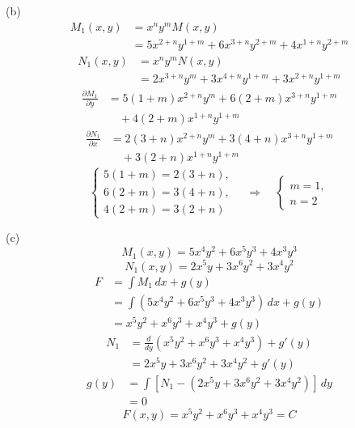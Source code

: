 \documentclass[11pt,a4paper]{article}
\begin{document}
\medskip
\noindent
(b)
\[
\begin{aligned}
M_1(x,y)&=x^ny^mM(x,y)\\
        &=5x^{2+n}y^{1+m}+6x^{3+n}y^{2+m}
          +4x^{1+n}y^{2+m}
\end{aligned}
\]
\[
\begin{aligned}
N_1(x,y)&=x^ny^mN(x,y)\\
        &=2x^{3+n}y^m+3x^{4+n}y^{1+m}
          +3x^{2+n}y^{1+m}
\end{aligned}
\]
\[
\begin{aligned}
\frac{\partial M_1}{\partial y}
&=5(1+m)x^{2+n}y^m+6(2+m)x^{3+n}y^{1+m}\\
&\quad+4(2+m)x^{1+n}y^{1+m}
\end{aligned}
\]
\[
\begin{aligned}
\frac{\partial N_1}{\partial x}
&=2(3+n)x^{2+n}y^m+3(4+n)x^{3+n}y^{1+m}\\
&\quad+3(2+n)x^{1+n}y^{1+m}
\end{aligned}
\]
\[
\begin{cases}
5(1+m)=2(3+n),\\
6(2+m)=3(4+n),\\
4(2+m)=3(2+n)
\end{cases}
\quad\Longrightarrow\quad
\begin{cases}
m=1,\\
n=2
\end{cases}
\]

\medskip
\noindent
(c)
\[
M_1(x,y)=5x^4y^2+6x^5y^3+4x^3y^3
\]
\[
N_1(x,y)=2x^5y+3x^6y^2+3x^4y^2
\]
\[
\begin{aligned}
F&=\int M_1\,dx+g(y)\\
 &=\int(5x^4y^2+6x^5y^3+4x^3y^3)\,dx+g(y)\\
 &=x^5y^2+x^6y^3+x^4y^3+g(y)
\end{aligned}
\]
\[
\begin{aligned}
N_1&=\frac{d}{dy}(x^5y^2+x^6y^3+x^4y^3)+g'(y)\\
   &=2x^5y+3x^6y^2+3x^4y^2+g'(y)
\end{aligned}
\]
\[
\begin{aligned}
g(y)&=\int[N_1-(2x^5y+3x^6y^2+3x^4y^2)]\,dy\\
    &=0
\end{aligned}
\]
\[
F(x,y)=x^5y^2+x^6y^3+x^4y^3=C
\]
\medskip
\end{document}
